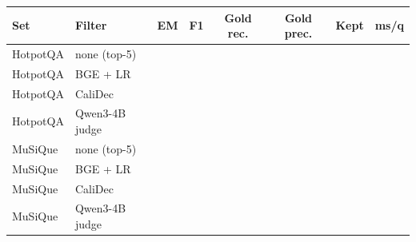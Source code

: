 \begin{tabular}{llcccccc}
\toprule
\textbf{Set} & \textbf{Filter} & \textbf{EM} & \textbf{F1} & \textbf{Gold rec.} & \textbf{Gold prec.} & \textbf{Kept} & \textbf{ms/q} \\
\midrule
HotpotQA & none (top-5) & \ph{--} & \ph{--} & \ph{--} & \ph{--} & \ph{--} & \ph{--} \\
HotpotQA & BGE + LR & \ph{--} & \ph{--} & \ph{--} & \ph{--} & \ph{--} & \ph{--} \\
HotpotQA & CaliDec & \ph{--} & \ph{--} & \ph{--} & \ph{--} & \ph{--} & \ph{--} \\
HotpotQA & Qwen3-4B judge & \ph{--} & \ph{--} & \ph{--} & \ph{--} & \ph{--} & \ph{--} \\
\midrule
MuSiQue & none (top-5) & \ph{--} & \ph{--} & \ph{--} & \ph{--} & \ph{--} & \ph{--} \\
MuSiQue & BGE + LR & \ph{--} & \ph{--} & \ph{--} & \ph{--} & \ph{--} & \ph{--} \\
MuSiQue & CaliDec & \ph{--} & \ph{--} & \ph{--} & \ph{--} & \ph{--} & \ph{--} \\
MuSiQue & Qwen3-4B judge & \ph{--} & \ph{--} & \ph{--} & \ph{--} & \ph{--} & \ph{--} \\
\bottomrule
\end{tabular}
